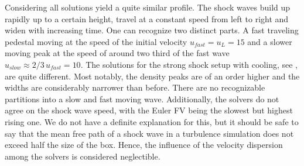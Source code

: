 Considering  all solutions yield a
quite similar profile. The shock waves build up rapidly up to a certain
height, travel at a constant speed from left to right and widen with increasing
time. One can recognize two distinct parts. A fast traveling pedestal moving at
the speed of the initial velocity $u_{fast} = u_L = 15$ and a slower moving
peak at the speed of around two third of the fast wave $u_{slow} \approx
2/3\,u_{fast} = 10$. 
The solutions for the strong shock setup with cooling, see
, are quite different. Most
notably, the density peaks are of an order higher and the widths are
considerably narrower than before. There are no recognizable partitions into a
slow and fast moving wave. Additionally, the solvers do not agree on the shock
wave speed, with the Euler FV  being the slowest but highest rising one. We do
not have a definite explanation for this, but it should be safe to say that the
mean free path of a shock wave in a turbulence simulation does not exceed half
the size of the box. Hence, the influence of the velocity dispersion among the
solvers is considered neglectible.



